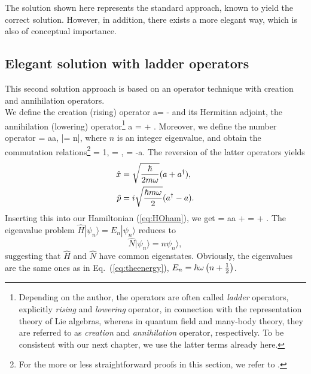 The solution shown here represents the standard approach, known to yield the correct solution. However, in addition, there exists a more elegant way, which is  also of conceptual importance.

\subsection{Elegant solution with ladder operators}
This second solution approach is based on an operator technique with creation and annihilation operators.
\\We define the creation (rising) operator
\be 
a\da = \lb {}- \rb
\ee
and its Hermitian adjoint, the annihilation (lowering) operator\footnote{Depending on the author, the operators are often called \textit{ladder} operators, explicitly \textit{rising} and \textit{lowering} operator, in connection with the representation theory of Lie algebras,  whereas in quantum field and many-body theory, they are referred to as \textit{creation} and \textit{annihilation} operator, respectively. To be consistent with our next chapter, we use the latter terms already here.}
\be 
a =  \lb {} +  \rb.
\ee
Moreover, we define the number operator
\be 
{} = a\da a, \qquad {}|\psi \rangle = n|\psi\rangle,
\ee
where $n$ is an integer eigenvalue, and obtain the commutation relations\footnote{For the more or less straightforward proofs in this section, we refer to \cite{griffiths2005introduction}.}
\be 
[a,a\da] = 1, \qquad [\hat{N},a\da] = \ad, \qquad [\hat{N},a] = -a.
\label{eq:HOcomm}
\ee
The reversion of the latter operators yields
\begin{align}
\hat{x} &= \sqrt{\frac{\hbar}{2m\omega}}(a+a^\dagger),\\
\hat{p} &= i \sqrt{\frac{\hbar m \omega}{2}}(a^\dagger - a).
\end{align}
Inserting this into our Hamiltonian (\ref{eq:HOham}), we get
\be 
{} = \hbar\omega\lb a\da a +  \rb = \hbar\omega \lb {} +  \rb.
\ee
The eigenvalue problem $\hat{H}|\psi_n\rangle = E_n|\psi_n\rangle$ reduces to
\[
\hat{N}|\psi_n\rangle = n \psi_n\rangle,
\]
suggesting that $\hat{H}$ and $\hat{N}$ have common eigenstates. Obviously, the eigenvalues are the same ones as in Eq.~(\ref{eq:theenergy}), $
E_n = \hbar\omega \left( n + \frac{1}{2} \right)$.
